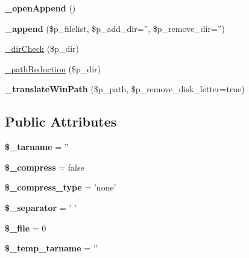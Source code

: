 \begin{DoxyCompactItemize}
\item 
\hypertarget{classArchive__Tar_a820b22f171a138df87eba147e38b334a}{
{\bfseries \_\-openAppend} ()}
\label{classArchive__Tar_a820b22f171a138df87eba147e38b334a}

\item 
\hypertarget{classArchive__Tar_a51021971e23415677dfd0f6ab8f50f84}{
{\bfseries \_\-append} (\$p\_\-filelist, \$p\_\-add\_\-dir='', \$p\_\-remove\_\-dir='')}
\label{classArchive__Tar_a51021971e23415677dfd0f6ab8f50f84}

\item 
\hyperlink{classArchive__Tar_a71daeb735a74c5fd40bab55bed4b90c3}{\_\-dirCheck} (\$p\_\-dir)
\item 
\hyperlink{classArchive__Tar_a54cee929a78e7c18005e71af154f0f65}{\_\-pathReduction} (\$p\_\-dir)
\item 
\hypertarget{classArchive__Tar_aaf7e01f317623726f1365e481cc41d1a}{
{\bfseries \_\-translateWinPath} (\$p\_\-path, \$p\_\-remove\_\-disk\_\-letter=true)}
\label{classArchive__Tar_aaf7e01f317623726f1365e481cc41d1a}

\end{DoxyCompactItemize}
\subsection*{Public Attributes}
\begin{DoxyCompactItemize}
\item 
\hypertarget{classArchive__Tar_a7cc5c744406cdfa42e99d77dcfd0bd2d}{
{\bfseries \$\_\-tarname} = ''}
\label{classArchive__Tar_a7cc5c744406cdfa42e99d77dcfd0bd2d}

\item 
\hypertarget{classArchive__Tar_a45b84be88b21c71519d22cb21541f228}{
{\bfseries \$\_\-compress} = false}
\label{classArchive__Tar_a45b84be88b21c71519d22cb21541f228}

\item 
\hypertarget{classArchive__Tar_aa26596b5c04a7dfa63dc5d10222ae48b}{
{\bfseries \$\_\-compress\_\-type} = 'none'}
\label{classArchive__Tar_aa26596b5c04a7dfa63dc5d10222ae48b}

\item 
\hypertarget{classArchive__Tar_aa8e95c52052fe7454593ceae6e8523c9}{
{\bfseries \$\_\-separator} = ' '}
\label{classArchive__Tar_aa8e95c52052fe7454593ceae6e8523c9}

\item 
\hypertarget{classArchive__Tar_ac134533a34b8fd41c2f55c39ed81b9df}{
{\bfseries \$\_\-file} = 0}
\label{classArchive__Tar_ac134533a34b8fd41c2f55c39ed81b9df}

\item 
\hypertarget{classArchive__Tar_a576fc357da2eac1f9f9608271103adb4}{
{\bfseries \$\_\-temp\_\-tarname} = ''}
\label{classArchive__Tar_a576fc357da2eac1f9f9608271103adb4}

\end{DoxyCompactItemize}


